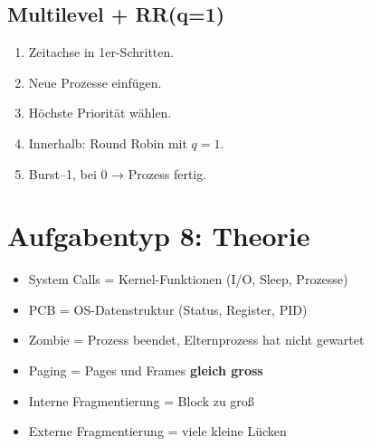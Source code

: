 \documentclass[a4paper,11pt]{article}
\begin{document}
\subsection*{Multilevel + RR(q=1)}

\begin{tcolorbox}[colback=bsybg,colframe=bsygreen,title=\textbf{RR + Prioritäten Rezept}]
\begin{enumerate}
\item Zeitachse in 1er-Schritten.
\item Neue Prozesse einfügen.
\item Höchste Priorität wählen.
\item Innerhalb: Round Robin mit \(q=1\).
\item Burst--1, bei 0 → Prozess fertig.
\end{enumerate}
\end{tcolorbox}

\section{Aufgabentyp 8: Theorie}

\begin{tcolorbox}[colback=bsybg,colframe=bsyyellow,title=\textbf{Mini-Merkzettel}]
\begin{itemize}
\item System Calls = Kernel-Funktionen (I/O, Sleep, Prozesse)
\item PCB = OS-Datenstruktur (Status, Register, PID)
\item Zombie = Prozess beendet, Elternprozess hat nicht gewartet
\item Paging = Pages und Frames \textbf{gleich gross}
\item Interne Fragmentierung = Block zu groß
\item Externe Fragmentierung = viele kleine Lücken
\end{itemize}
\end{tcolorbox}
\end{document}
